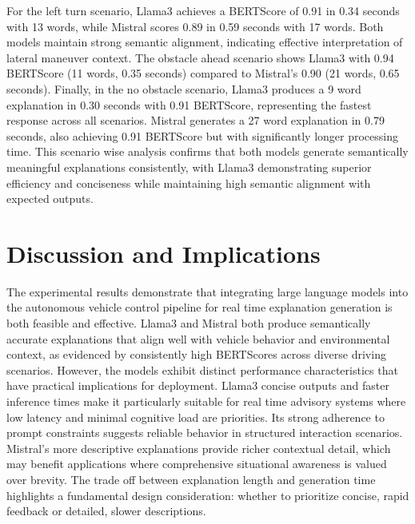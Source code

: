 \documentclass[a4paper,12pt,one side]{report}
\theoremstyle{definition}
\begin{document}
\begin{itemize}
For the left turn scenario, Llama3 achieves a BERTScore of 0.91 in 0.34 seconds with 13 words, while Mistral scores 0.89 in 0.59 seconds with 17 words. Both models maintain strong semantic alignment, indicating effective interpretation of lateral maneuver context. The obstacle ahead scenario shows Llama3 with 0.94 BERTScore (11 words, 0.35 seconds) compared to Mistral's 0.90 (21 words, 0.65 seconds). Finally, in the no obstacle scenario, Llama3 produces a 9 word explanation in 0.30 seconds with 0.91 BERTScore, representing the fastest response across all scenarios. Mistral generates a 27 word explanation in 0.79 seconds, also achieving 0.91 BERTScore but with significantly longer processing time. This scenario wise analysis confirms that both models generate semantically meaningful explanations consistently, with Llama3 demonstrating superior efficiency and conciseness while maintaining high semantic alignment with expected outputs.

\section{Discussion and Implications}

The experimental results demonstrate that integrating large language models into the autonomous vehicle control pipeline for real time explanation generation is both feasible and effective. Llama3 and Mistral both produce semantically accurate explanations that align well with vehicle behavior and environmental context, as evidenced by consistently high BERTScores across diverse driving scenarios. However, the models exhibit distinct performance characteristics that have practical implications for deployment. Llama3 concise outputs and faster inference times make it particularly suitable for real time advisory systems where low latency and minimal cognitive load are priorities. Its strong adherence to prompt constraints suggests reliable behavior in structured interaction scenarios. Mistral's more descriptive explanations provide richer contextual detail, which may benefit applications where comprehensive situational awareness is valued over brevity. The trade off between explanation length and generation time highlights a fundamental design consideration: whether to prioritize concise, rapid feedback or detailed, slower descriptions.


\end{itemize}
\end{document}
